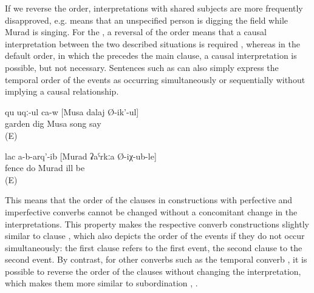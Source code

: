 If we reverse the order, interpretations with shared subjects are more frequently disapproved, e.g.  means that an unspecified person is digging the field while Murad is singing. For the , a reversal of the order means that a causal interpretation between the two described situations is required , whereas in the default order, in which the  precedes the main clause, a causal interpretation is possible, but not necessary. Sentences such as  can also simply express the temporal order of the events as occurring simultaneously or sequentially without implying a causal relationship.
%
\begin{exe}
	\ex	\label{ex:‎‎‎(He) is digging the field while Musa is singing}
	\gll	qu	uqː-ul	ca-w	[Musa	dalaj	Ø-ik'-ul]\\
		garden	dig		Musa	song	say\\
	\glt	{} (E)

	\ex	\label{ex:Because Murad got ill, he (= Murad or another person) did not build the fence2}
	\gll	lac	a-b-arq'-ib	[Murad	ʡaˁrkːa	Ø-iχ-ub-le]\\
		fence	do	Murad	ill	be\\
	\glt	{} (E)
\end{exe}

This means that the order of the clauses in constructions with perfective and imperfective converbs cannot be changed without a concomitant change in the interpretations. This property makes the respective converb constructions slightly similar to clause , which also depicts the order of the events if they do not occur simultaneously: the first clause refers to the first event, the second clause to the second event. By contrast, for other converbs such as the temporal converb , it is possible to reverse the order of the clauses without changing the interpretation, which makes them more similar to subordination , .


